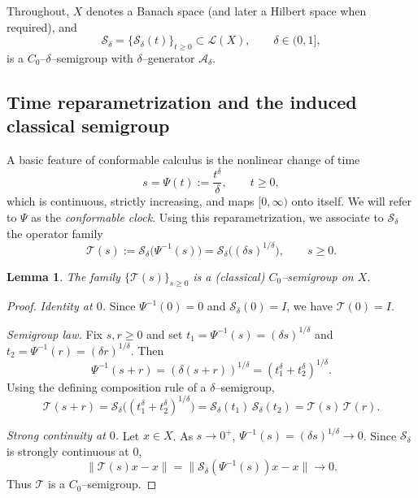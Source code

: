 \documentclass[preprint,12pt]{elsarticle}
\newtheorem{lemma}{Lemma}
\newtheorem{proof}{Proof}
\begin{document}
Throughout, $X$ denotes a Banach space (and later a Hilbert space when required),
and
\[
\mathcal S_\delta=\{\mathcal S_\delta(t)\}_{t\ge0}\subset\mathcal L(X),
\qquad \delta\in(0,1],
\]
is a $C_0$--$\delta$--semigroup with $\delta$--generator $\mathcal A_\delta$.

\subsection*{Time reparametrization and the induced classical semigroup}

A basic feature of conformable calculus is the nonlinear change of time
\[
s=\Psi(t):=\frac{t^\delta}{\delta},\qquad t\ge0,
\]
which is continuous, strictly increasing, and maps $[0,\infty)$ onto itself.
We will refer to $\Psi$ as the \emph{conformable clock}.
Using this reparametrization, we associate to $\mathcal S_\delta$ the operator family
\[
\mathcal T(s):=\mathcal S_\delta\!\bigl(\Psi^{-1}(s)\bigr)
=\mathcal S_\delta\!\bigl((\delta s)^{1/\delta}\bigr),
\qquad s\ge0.
\]

\begin{lemma}\label{lem:TisC0_combined}
The family $\{\mathcal T(s)\}_{s\ge0}$ is a (classical) $C_0$--semigroup on $X$.
\end{lemma}

\begin{proof}
\emph{Identity at $0$.}
Since $\Psi^{-1}(0)=0$ and $\mathcal S_\delta(0)=I$, we have $\mathcal T(0)=I$.

\smallskip
\emph{Semigroup law.}
Fix $s,r\ge0$ and set $t_1=\Psi^{-1}(s)=(\delta s)^{1/\delta}$ and
$t_2=\Psi^{-1}(r)=(\delta r)^{1/\delta}$.
Then
\[
\Psi^{-1}(s+r)=(\delta(s+r))^{1/\delta}=(t_1^\delta+t_2^\delta)^{1/\delta}.
\]
Using the defining composition rule of a $\delta$--semigroup,
\[
\mathcal T(s+r)
=\mathcal S_\delta\!\bigl((t_1^\delta+t_2^\delta)^{1/\delta}\bigr)
=\mathcal S_\delta(t_1)\,\mathcal S_\delta(t_2)
=\mathcal T(s)\,\mathcal T(r).
\]

\smallskip
\emph{Strong continuity at $0$.}
Let $x\in X$. As $s\to0^+$, $\Psi^{-1}(s)=(\delta s)^{1/\delta}\to0$.
Since $\mathcal S_\delta$ is strongly continuous at $0$,
\[
\|\mathcal T(s)x-x\|
=\|\mathcal S_\delta(\Psi^{-1}(s))x-x\|\longrightarrow 0.
\]
Thus $\mathcal T$ is a $C_0$--semigroup.
\end{proof}

\end{document}
